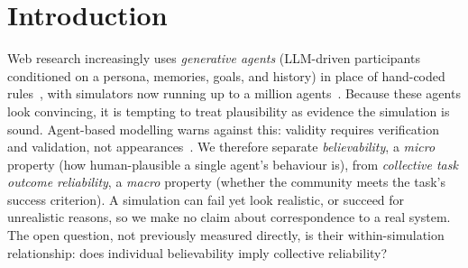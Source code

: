 \documentclass[runningheads]{llncs}
\begin{document}
\section{Introduction}\label{sec:intro}
Web research increasingly uses \emph{generative agents} (LLM-driven participants conditioned on
a persona, memories, goals, and history) in place of hand-coded
rules~\cite{park2023generative,gao2024survey,ghaffarzadegan2024tutorial}, with simulators now
running up to a million agents~\cite{yang2024oasis,piao2025agentsociety}. Because these agents
look convincing, it is tempting to treat plausibility as evidence the simulation is sound.
Agent-based modelling warns against this: validity requires verification and validation, not
appearances~\cite{windrum2007empirical,moss2005towards}. We therefore separate
\emph{believability}, a \emph{micro} property (how human-plausible a single agent's behaviour is),
from \emph{collective task outcome reliability}, a \emph{macro} property (whether the community
meets the task's success criterion). A simulation can fail yet look realistic, or succeed for
unrealistic reasons, so we make no claim about correspondence to a real system. The open question,
not previously measured directly, is their within-simulation relationship: does individual
believability imply collective reliability?
\end{document}
